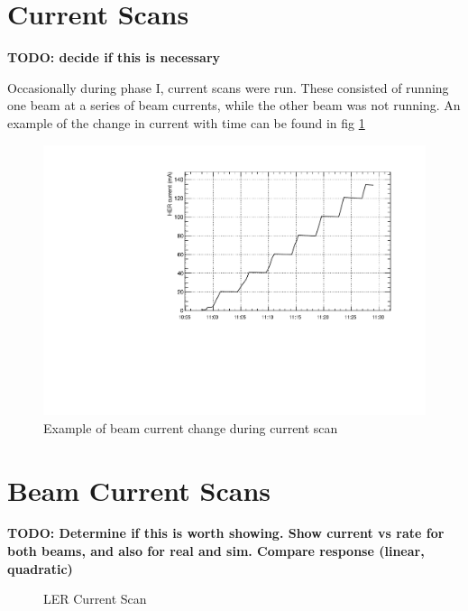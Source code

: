 \section{Current Scans}

\textbf{TODO: decide if this is necessary}

Occasionally during phase I, current scans were run. These consisted of running one beam at a series of beam currents, while the other beam was not running. An example of the change in current with time can be found in fig \ref{fig:CurrentEg}




\begin{figure}[htb]
	\centerfloat
		\includegraphics[trim={0 0 0 0.75cm},clip, width=\textwidth]{images/CurrentScan}
	\caption{Example of beam current change during current scan}	
	\label{fig:CurrentEg}
\end{figure}



\section{Beam Current Scans}

\textbf{TODO: Determine if this is worth showing. Show current vs rate for both beams, and also for real and sim. Compare response (linear, quadratic)}


\begin{figure}
	\centering
	\caption[LER Current Scan]{LER Current Scan}		
\label{fig:LERCURScan}
\end{figure}


